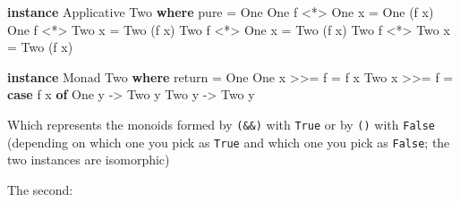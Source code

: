 \documentclass[]{article}
\newenvironment{Shaded}{}{}
\newcommand{\DataTypeTok}[1]{\textcolor[rgb]{0.56,0.13,0.00}{#1}}
\newcommand{\FunctionTok}[1]{\textcolor[rgb]{0.02,0.16,0.49}{#1}}
\newcommand{\KeywordTok}[1]{\textcolor[rgb]{0.00,0.44,0.13}{\textbf{#1}}}
\newcommand{\NormalTok}[1]{#1}
\newcommand{\OperatorTok}[1]{\textcolor[rgb]{0.40,0.40,0.40}{#1}}
\newcommand{\OtherTok}[1]{\textcolor[rgb]{0.00,0.44,0.13}{#1}}
\begin{document}
\begin{Shaded}
\begin{Highlighting}[]
\KeywordTok{instance} \DataTypeTok{Applicative} \DataTypeTok{Two} \KeywordTok{where}
    \FunctionTok{pure} \OtherTok{=} \DataTypeTok{One}
    \DataTypeTok{One}\NormalTok{ f }\OperatorTok{<*>} \DataTypeTok{One}\NormalTok{ x }\OtherTok{=} \DataTypeTok{One}\NormalTok{ (f x)}
    \DataTypeTok{One}\NormalTok{ f }\OperatorTok{<*>} \DataTypeTok{Two}\NormalTok{ x }\OtherTok{=} \DataTypeTok{Two}\NormalTok{ (f x)}
    \DataTypeTok{Two}\NormalTok{ f }\OperatorTok{<*>} \DataTypeTok{One}\NormalTok{ x }\OtherTok{=} \DataTypeTok{Two}\NormalTok{ (f x)}
    \DataTypeTok{Two}\NormalTok{ f }\OperatorTok{<*>} \DataTypeTok{Two}\NormalTok{ x }\OtherTok{=} \DataTypeTok{Two}\NormalTok{ (f x)}

\KeywordTok{instance} \DataTypeTok{Monad} \DataTypeTok{Two} \KeywordTok{where}
    \FunctionTok{return} \OtherTok{=} \DataTypeTok{One}
    \DataTypeTok{One}\NormalTok{ x }\OperatorTok{>>=}\NormalTok{ f }\OtherTok{=}\NormalTok{ f x}
    \DataTypeTok{Two}\NormalTok{ x }\OperatorTok{>>=}\NormalTok{ f }\OtherTok{=} \KeywordTok{case}\NormalTok{ f x }\KeywordTok{of}
                    \DataTypeTok{One}\NormalTok{ y }\OtherTok{{-}>} \DataTypeTok{Two}\NormalTok{ y}
                    \DataTypeTok{Two}\NormalTok{ y }\OtherTok{{-}>} \DataTypeTok{Two}\NormalTok{ y}
\end{Highlighting}
\end{Shaded}

Which represents the monoids formed by \texttt{(\&\&)} with \texttt{True} or by
\texttt{(\textbar{}\textbar{})} with \texttt{False} (depending on which one you
pick as \texttt{True} and which one you pick as \texttt{False}; the two
instances are isomorphic)

The second:
\end{document}
